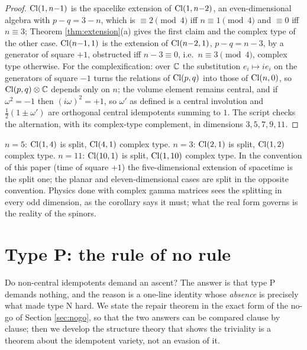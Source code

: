 \begin{proof}
$\mathrm{Cl}(1,n{-}1)$ is the spacelike extension of $\mathrm{Cl}(1,n{-}2)$, an even-dimensional algebra with $p - q = 3 - n$, which is $\equiv 2 \pmod 4$ iff $n \equiv 1 \pmod 4$ and $\equiv 0$ iff $n \equiv 3$; Theorem \ref{thm:extension}(a) gives the first claim and the complex type of the other case. $\mathrm{Cl}(n{-}1,1)$ is the extension of $\mathrm{Cl}(n{-}2,1)$, $p - q = n - 3$, by a generator of square $+1$, obstructed iff $n - 3 \equiv 0$, i.e.\ $n \equiv 3 \pmod 4$, complex type otherwise. For the complexification: over $\mathbb{C}$ the substitution $e_i \mapsto ie_i$ on the generators of square $-1$ turns the relations of $\mathrm{Cl}(p,q)$ into those of $\mathrm{Cl}(n,0)$, so $\mathrm{Cl}(p,q) \otimes \mathbb{C}$ depends only on $n$; the volume element remains central, and if $\omega^2 = -1$ then $(i\omega)^2 = +1$, so $\omega'$ as defined is a central involution and $\tfrac12(1 \pm \omega')$ are orthogonal central idempotents summing to $1$. The script checks the alternation, with its complex-type complement, in dimensions $3, 5, 7, 9, 11$.
\end{proof}

\begin{remark}\label{rem:threecases}
$n = 5$: $\mathrm{Cl}(1,4)$ is split, $\mathrm{Cl}(4,1)$ complex type. $n = 3$: $\mathrm{Cl}(2,1)$ is split, $\mathrm{Cl}(1,2)$ complex type. $n = 11$: $\mathrm{Cl}(10,1)$ is split, $\mathrm{Cl}(1,10)$ complex type. In the convention of this paper (time of square $+1$) the five-dimensional extension of spacetime is the split one; the planar and eleven-dimensional cases are split in the opposite convention. Physics done with complex gamma matrices sees the splitting in every odd dimension, as the corollary says it must; what the real form governs is the reality of the spinors.
\end{remark}

\section{Type P: the rule of no rule}\label{sec:typeP-rule}

Do non-central idempotents demand an ascent? The answer is that type P demands nothing, and the reason is a one-line identity whose \emph{absence} is precisely what made type N hard. We state the repair theorem in the exact form of the no-go of Section \ref{sec:nogo}, so that the two answers can be compared clause by clause; then we develop the structure theory that shows the triviality is a theorem about the idempotent variety, not an evasion of it.

